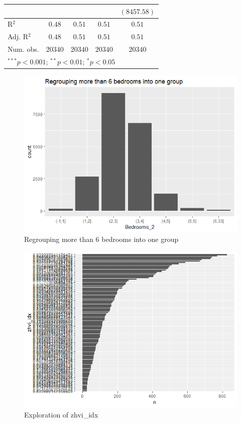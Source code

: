 \documentclass[12pt,a4paper]{article}
\begin{document}
\begin{table}[H]
\begin{adjustbox}{width=1\textwidth}
\begin{tabular}{l c c c c}
			&                   &                    &                    & $(8457.58)$        \\
			\hline
			R$^2$                   & $0.48$            & $0.51$             & $0.51$             & $0.51$             \\
			Adj. R$^2$              & $0.48$            & $0.51$             & $0.51$             & $0.51$             \\
			Num. obs.               & $20340$           & $20340$            & $20340$            & $20340$            \\
			\hline
			\multicolumn{5}{l}{\scriptsize{$^{***}p<0.001$; $^{**}p<0.01$; $^{*}p<0.05$}}
	\end{tabular}
	\end{adjustbox}
\end{table}

\begin{figure}[H]
	\centering
	\caption{Regrouping more than 6 bedrooms into one group}
	\label{fig:regrouping-bedrooms}
	\includegraphics[width=0.8\linewidth]{"Regrouping bedrooms"}
\end{figure}

\begin{figure}[H]
	\centering
	\caption{Exploration of zhvi\_idx}
	\label{fig:zhviindex-eploration}
	\includegraphics[width=0.8\linewidth]{"zhvi_index eploration"}
\end{figure}
\end{document}
